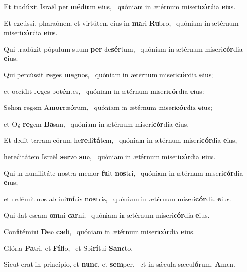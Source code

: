 \item Et tradúxit Israël per \textbf{mé}dium \textbf{e}ius,~\psstar{} quóniam in ætérnum miseri\textbf{cór}dia \textbf{e}ius.

\item Et excússit pharaónem et virtútem eius in \textbf{ma}ri \textbf{Ru}bro,~\psstar{} quóniam in ætérnum miseri\textbf{cór}dia \textbf{e}ius.

\item Qui tradúxit pópulum suum \textbf{per} de\textbf{sér}tum,~\psstar{} quóniam in ætérnum miseri\textbf{cór}dia \textbf{e}ius.

\item Qui percússit \textbf{re}ges \textbf{ma}gnos,~\psstar{} quóniam in ætérnum miseri\textbf{cór}dia \textbf{e}ius;

\item et occídit \textbf{re}ges pot\textbf{én}tes,~\psstar{} quóniam in ætérnum miseri\textbf{cór}dia \textbf{e}ius:

\item Sehon regem A\textbf{mor}ræ\textbf{ó}rum,~\psstar{} quóniam in ætérnum miseri\textbf{cór}dia \textbf{e}ius;

\item et Og \textbf{re}gem \textbf{Ba}san,~\psstar{} quóniam in ætérnum miseri\textbf{cór}dia \textbf{e}ius.

\item Et dedit terram eórum he\textbf{re}di\textbf{tá}tem,~\psstar{} quóniam in ætérnum miseri\textbf{cór}dia \textbf{e}ius,

\item hereditátem Israël \textbf{ser}vo \textbf{su}o,~\psstar{} quóniam in ætérnum miseri\textbf{cór}dia \textbf{e}ius.

\item Qui in humilitáte nostra memor \textbf{fu}it \textbf{nos}tri,~\psstar{} quóniam in ætérnum miseri\textbf{cór}dia \textbf{e}ius;

\item et redémit nos ab ini\textbf{mí}cis \textbf{nos}tris,~\psstar{} quóniam in ætérnum miseri\textbf{cór}dia \textbf{e}ius.

\item Qui dat escam \textbf{om}ni \textbf{car}ni,~\psstar{} quóniam in ætérnum miseri\textbf{cór}dia \textbf{e}ius.

\item Confitémini \textbf{De}o \textbf{cæ}li,~\psstar{} quóniam in ætérnum miseri\textbf{cór}dia \textbf{e}ius.

\item Glória \textbf{Pa}tri, et \textbf{Fí}\textbf{li}o,~\psstar{} et Spi\textbf{rí}tui \textbf{Sanc}to.

\item Sicut erat in princípio, et \textbf{nunc}, et \textbf{sem}per,~\psstar{} et in sǽcula sæcu\textbf{ló}rum. \textbf{A}men.